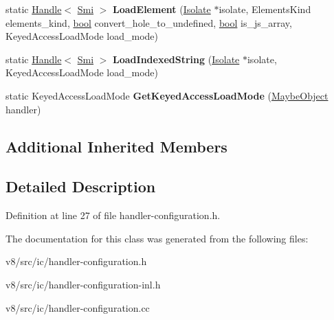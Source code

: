 \begin{DoxyCompactItemize}
static \mbox{\hyperlink{classv8_1_1internal_1_1Handle}{Handle}}$<$ \mbox{\hyperlink{classv8_1_1internal_1_1Smi}{Smi}} $>$ {\bfseries Load\+Element} (\mbox{\hyperlink{classv8_1_1internal_1_1Isolate}{Isolate}} $\ast$isolate, Elements\+Kind elements\+\_\+kind, \mbox{\hyperlink{classbool}{bool}} convert\+\_\+hole\+\_\+to\+\_\+undefined, \mbox{\hyperlink{classbool}{bool}} is\+\_\+js\+\_\+array, Keyed\+Access\+Load\+Mode load\+\_\+mode)
\item 
\mbox{\label{classv8_1_1internal_1_1LoadHandler_aa43a58dfef18a794abdfd3ac6379d788}} 
static \mbox{\hyperlink{classv8_1_1internal_1_1Handle}{Handle}}$<$ \mbox{\hyperlink{classv8_1_1internal_1_1Smi}{Smi}} $>$ {\bfseries Load\+Indexed\+String} (\mbox{\hyperlink{classv8_1_1internal_1_1Isolate}{Isolate}} $\ast$isolate, Keyed\+Access\+Load\+Mode load\+\_\+mode)
\item 
\mbox{\label{classv8_1_1internal_1_1LoadHandler_ac7f8f4be0b7cefa5d733bd772b3ea5f1}} 
static Keyed\+Access\+Load\+Mode {\bfseries Get\+Keyed\+Access\+Load\+Mode} (\mbox{\hyperlink{classv8_1_1internal_1_1MaybeObject}{Maybe\+Object}} handler)
\end{DoxyCompactItemize}
\subsection*{Additional Inherited Members}


\subsection{Detailed Description}


Definition at line 27 of file handler-\/configuration.\+h.



The documentation for this class was generated from the following files\+:\begin{DoxyCompactItemize}
\item 
v8/src/ic/handler-\/configuration.\+h\item 
v8/src/ic/handler-\/configuration-\/inl.\+h\item 
v8/src/ic/handler-\/configuration.\+cc\end{DoxyCompactItemize}
